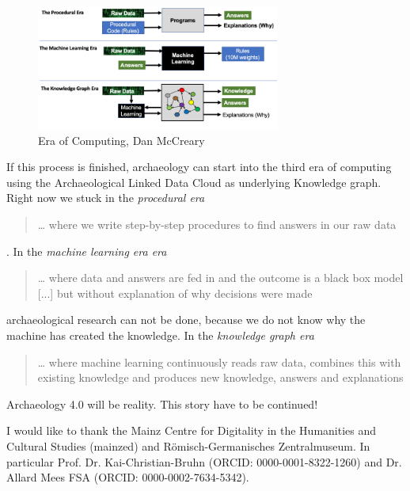 \documentclass[twocolumn]{autart}
\begin{document}
\begin{figure}[!htb]
\begin{center}
\includegraphics[width=8cm]{1_78b9DR1EApGRAst5FkPrwQ.png}   
\caption{Era of Computing, Dan McCreary \cite{mccreary_computing}} 
\label{figeoco}                                
\end{center}                               
\end{figure}

If this process is finished, archaeology can start into the third era of computing \cite{hey_computing} using the Archaeological Linked Data Cloud as underlying Knowledge graph. Right now we stuck in the \textit{procedural era} \begin{quotation}… where we write step-by-step procedures to find answers in our raw data\cite{mccreary_computing}\end{quotation}. In the \textit{machine learning era era} \begin{quotation}… where data and answers are fed in and the outcome is a black box model [...] but without explanation of why decisions were made\cite{mccreary_computing}\end{quotation} archaeological research can not be done, because we do not know why the machine has created the knowledge. In the \textit{knowledge graph era} \begin{quotation}… where machine learning continuously reads raw
data, combines this with existing knowledge and produces new knowledge, answers and explanations\cite{mccreary_computing}\end{quotation} Archaeology 4.0 will be reality. This story have to be continued!

\begin{ack}                               
I would like to thank the Mainz Centre for Digitality in the Humanities and Cultural Studies (mainzed) and R\"omisch-Germanisches Zentralmuseum. In particular Prof. Dr. Kai-Christian-Bruhn (ORCID: 0000-0001-8322-1260) and Dr. Allard Mees FSA (ORCID: 0000-0002-7634-5342).
\end{ack}



\end{document}
